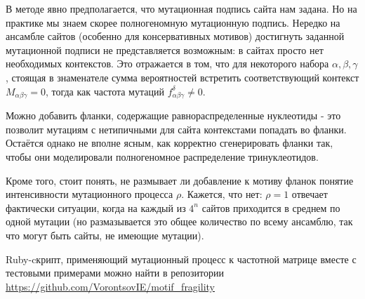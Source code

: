 \documentclass[a4paper]{article}
\begin{document}
В методе явно предполагается, что мутационная подпись сайта нам задана. Но на практике мы знаем скорее полногеномную мутационную подпись. Нередко на ансамбле сайтов (особенно для консервативных мотивов) достигнуть заданной мутационной подписи не представляется возможным: в сайтах просто нет необходимых контекстов. Это отражается в том, что для некоторого набора $\alpha, \beta, \gamma$, стоящая в знаменателе сумма вероятностей встретить соответствующий контекст $M_{\alpha\beta\gamma} = 0$, тогда как частота мутаций $f_{\alpha\beta\gamma}^{\delta}\ne 0$.

Можно добавить фланки, содержащие равнораспределенные нуклеотиды - это позволит мутациям с нетипичными для сайта контекстами попадать во фланки. Остаётся однако не вполне ясным, как корректно сгенерировать фланки так, чтобы они моделировали полногеномное распределение тринуклеотидов.

Кроме того, стоит понять, не размывает ли добавление к мотиву фланок понятие интенсивности мутационного процесса $\rho$. Кажется, что нет: $\rho=1$ отвечает фактически ситуации, когда на каждый из $4^n$ сайтов приходится в среднем по одной мутации (но размазывается это общее количество по всему ансамблю, так что могут быть сайты, не имеющие мутации).

Ruby-cкрипт, применяющий мутационный процесс к частотной матрице вместе с тестовыми примерами можно найти в репозитории \url{https://github.com/VorontsovIE/motif_fragility}
\end{document}
